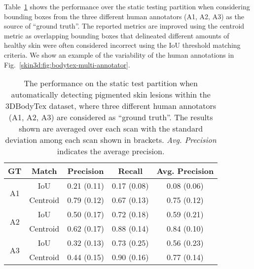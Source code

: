 \documentclass[journal]{IEEEtran}
\begin{document}
Table~\ref{skin3d:tab:bodytex_results} shows the performance over the static testing partition when considering bounding boxes from the three different human annotators (A1, A2, A3) as the source of ``ground truth''. The reported metrics are improved using the centroid metric as overlapping bounding boxes that delineated different amounts of healthy skin were often considered incorrect using the IoU threshold matching criteria. We show an example of the variability of the human annotations in Fig.~\ref{skin3d:fig:bodytex-multi-annotator}. 

\begin{table}[htb]
    \caption{The performance on the static test partition when automatically detecting pigmented skin lesions within the 3DBodyTex dataset, where three different human annotators (A1, A2, A3) are considered as ``ground truth''. The results shown are averaged over each scan with the standard deviation among each scan shown in brackets. \emph{Avg. Precision} indicates the average precision.}
    \centering
    \begin{tabular}{@{}c c c c c@{}}
    GT & Match & Precision & Recall & Avg. Precision \\
    \toprule
    \multirow{2}{*}{A1} 
    & IoU & 0.21 (0.11) & 0.17 (0.08) & 0.08 (0.06) \\
    & Centroid & 0.79 (0.12) & 0.67 (0.13) & 0.75 (0.12) \\

    \hline
    \multirow{2}{*}{A2} 
    & IoU & 0.50 (0.17) & 0.72 (0.18) & 0.59 (0.21) \\
    & Centroid & 0.62 (0.17) & 0.88 (0.14) & 0.84 (0.10) \\

    \hline
    \multirow{2}{*}{A3} 
    & IoU & 0.32 (0.13) & 0.73 (0.25) & 0.56 (0.23) \\
    & Centroid & 0.44 (0.15) & 0.90 (0.16) & 0.77 (0.14) \\
    \bottomrule
    \end{tabular}
    \label{skin3d:tab:bodytex_results}
\end{table}
\end{document}

